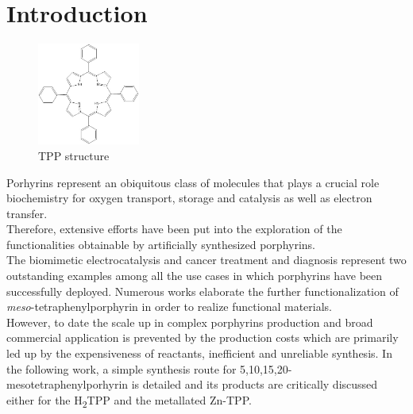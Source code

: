 \documentclass[twoside,twocolumn,9pt]{article}
\begin{document}
	\section{Introduction}
	\begin{figure}
		\includegraphics[width=0.3\textwidth]{TPP}
		\caption{TPP structure}
		\label{TPP-structure}
	\end{figure}
	Porhyrins represent an obiquitous class of molecules that plays a crucial role biochemistry for oxygen transport\citep{hardison_evolution_2012}, storage\citep{kendrew_three-dimensional_1958} and catalysis as well as electron transfer\citep{keilin_cytochrome_1925}.\\
	Therefore, extensive efforts have been put into the exploration of the functionalities obtainable by artificially synthesized porphyrins.\\
	The biomimetic electrocatalysis\cite{facchin_oxygen_2021,liang_porphyrin-based_2021} and cancer treatment and diagnosis\cite{wang_recent_2021} represent two outstanding examples among all the use cases in which porphyrins have been successfully deployed.
	Numerous works elaborate the further functionalization of \textit{meso}-tetraphenylporphyrin\cite{silva_porphyrins_2006} in order to realize functional materials. \\
	However, to date the scale up in complex porphyrins production and broad commercial application is prevented by the production costs which are primarily led up by the expensiveness of reactants, inefficient and unreliable synthesis.
	In the following work, a simple synthesis route for 5,10,15,20-mesotetraphenylporhyrin is detailed and its products are critically discussed either for the \texorpdfstring{H\textsubscript{2}}-TPP and the metallated Zn-TPP.
\end{document}
